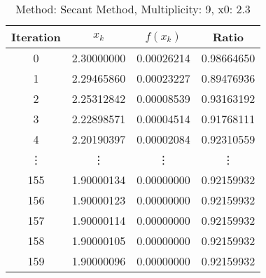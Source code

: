 \begin{table}
\centering
\caption{Method: Secant Method, Multiplicity: 9, x0: 2.3}
\label{tab:table_Secant_Method_9_2_3}
\begin{tabular}{c c c c}
\toprule
Iteration &      $x_k$ &   $f(x_k)$ &      Ratio \\
\midrule
        0 & 2.30000000 & 0.00026214 & 0.98664650 \\
        1 & 2.29465860 & 0.00023227 & 0.89476936 \\
        2 & 2.25312842 & 0.00008539 & 0.93163192 \\
        3 & 2.22898571 & 0.00004514 & 0.91768111 \\
        4 & 2.20190397 & 0.00002084 & 0.92310559 \\
   \vdots &     \vdots &     \vdots &     \vdots \\
      155 & 1.90000134 & 0.00000000 & 0.92159932 \\
      156 & 1.90000123 & 0.00000000 & 0.92159932 \\
      157 & 1.90000114 & 0.00000000 & 0.92159932 \\
      158 & 1.90000105 & 0.00000000 & 0.92159932 \\
      159 & 1.90000096 & 0.00000000 & 0.92159932 \\
\bottomrule
\end{tabular}
\end{table}
